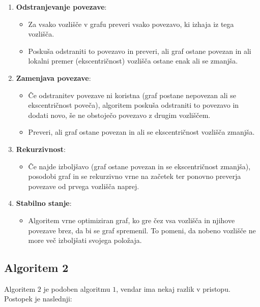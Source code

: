 \documentclass[fin1, tisk]{fmfdelo}
\begin{document}
\begin{enumerate}
    \item \textbf{Odstranjevanje povezave}:
    \begin{itemize}
        \item Za vsako vozlišče v grafu preveri vsako povezavo, ki izhaja iz tega vozlišča.
        \item Poskuša odstraniti to povezavo in preveri, ali graf ostane povezan in ali lokalni premer (ekscentričnost) vozlišča ostane enak ali se zmanjša.
    \end{itemize}
    
    \item \textbf{Zamenjava povezave}:
    \begin{itemize}
        \item Če odstranitev povezave ni koristna (graf postane nepovezan ali se ekscentričnost poveča), algoritem poskuša odstraniti to povezavo in dodati novo, še ne obstoječo povezavo z drugim vozliščem.
        \item Preveri, ali graf ostane povezan in ali se ekscentričnost vozlišča zmanjša.
    \end{itemize}
    
    \item \textbf{Rekurzivnost}:
    \begin{itemize}
        \item Če najde izboljšavo (graf ostane povezan in se ekscentričnost zmanjša), posodobi graf in se rekurzivno vrne na začetek ter ponovno preverja povezave od prvega vozlišča naprej.
    \end{itemize}
    
    \item \textbf{Stabilno stanje}:
    \begin{itemize}
        \item Algoritem vrne optimiziran graf, ko gre čez vsa vozlišča in njihove povezave brez, da bi se graf spremenil. To pomeni, da nobeno vozlišče ne more več izboljšati svojega položaja.
    \end{itemize}
\end{enumerate}

\subsection*{Algoritem 2}

Algoritem $2$ je podoben algoritmu $1$, vendar ima nekaj razlik v pristopu. Postopek je naslednji:
\end{document}
